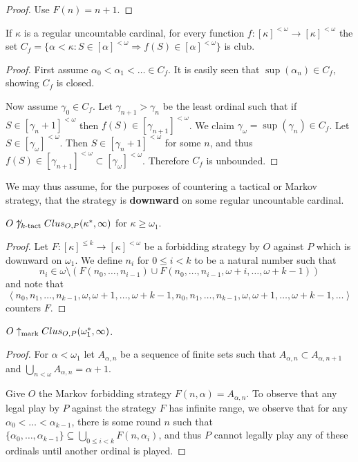 \begin{proof}
Use $F(n)=n+1$.
\end{proof}

\begin{theorem}
If $\kappa$ is a regular uncountable cardinal, for every function $f:[\kappa]^{<\omega}\to[\kappa]^{<\omega}$ the set $C_f = \{\alpha < \kappa : S\in[\alpha]^{<\omega} \Rightarrow f(S)\in[\alpha]^{<\omega}\}$ is club.
\end{theorem}

\begin{proof}
First assume $\alpha_0<\alpha_1<\dots\in C_f$. It is easily seen that $\sup(\alpha_n)\in C_f$, showing $C_f$ is closed.

Now assume $\gamma_0\in C_f$. Let $\gamma_{n+1}>\gamma_n$ be the least ordinal such that if $S\in[\gamma_n+1]^{<\omega}$ then $f(S)\in[\gamma_{n+1}]^{<\omega}$. We claim $\gamma_\omega = \sup(\gamma_n)\in C_f$. Let $S\in[\gamma_\omega]^{<\omega}$. Then $S\in[\gamma_n+1]^{<\omega}$ for some $n$, and thus $f(S)\in[\gamma_{n+1}]^{<\omega}\subset[\gamma_\omega]^{<\omega}$. Therefore $C_f$ is unbounded.
\end{proof}

We may thus assume, for the purposes of countering a tactical or Markov strategy, that the strategy is \textbf{downward} on some regular uncountable cardinal.

\begin{theorem}
$O\not\uparrow_{k\text{-tact}}Clus_{O,P}(\kappa^*,\infty)$ for $\kappa\geq\omega_1$.
\end{theorem}

\begin{proof}
Let $F:[\kappa]^{\leq k} \to [\kappa]^{<\omega}$ be a forbidding strategy by $O$ against $P$ which is downward on $\omega_1$. We define $n_i$ for $0\leq i < k$ to be a natural number such that \[ n_i \in \omega \setminus(F(n_0,\dots,n_{i-1}) \cup F(n_0,\dots,n_{i-1},\omega+i,\dots,\omega+k-1))\] and note that\[\left<n_0,n_1,\dots,n_{k-1},\omega,\omega+1,\dots,\omega+k-1,n_0,n_1,\dots,n_{k-1},\omega,\omega+1,\dots,\omega+k-1,\dots\right>\] counters $F$.
\end{proof}

\begin{theorem}
$O\uparrow_{\text{mark}} Clus_{O,P}(\omega_1^*,\infty)$.
\end{theorem}

\begin{proof}
For $\alpha<\omega_1$ let $A_{\alpha,n}$ be a sequence of finite sets such that $A_{\alpha,n}\subset A_{\alpha,n+1}$ and $\bigcup_{n<\omega}A_{\alpha,n}=\alpha+1$.

Give $O$ the Markov forbidding strategy $F(n,\alpha)=A_{\alpha,n}$. To observe that any legal play by $P$ against the strategy $F$ has infinite range, we observe that for any $\alpha_0<\dots<\alpha_{k-1}$, there is some round $n$ such that $\{\alpha_0,\dots,\alpha_{k-1}\}\subseteq \bigcup_{0\leq i < k}F(n,\alpha_i)$, and thus $P$ cannot legally play any of these ordinals until another ordinal is played.
\end{proof}

